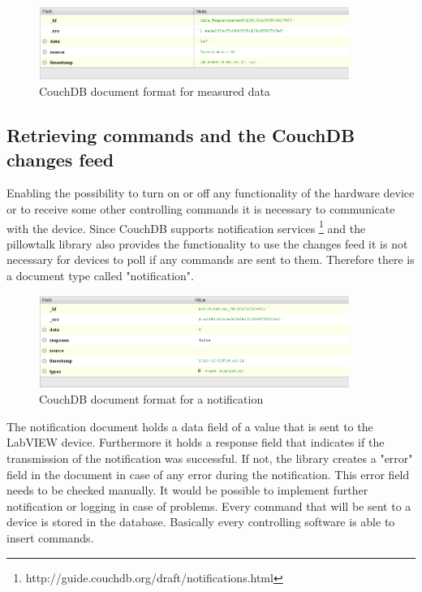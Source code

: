 \begin{figure}[h!]
  \centering
      \includegraphics[width=0.9\textwidth]{images/CouchDBDoc_Data.png}
  \caption{CouchDB document format for measured data}
  \label{figure:CouchDBDocumentFormatData}
\end{figure}

\subsection{Retrieving commands and the CouchDB changes feed}
Enabling the possibility to turn on or off any functionality of the hardware device or to receive some other controlling commands it is necessary to communicate with the device. Since CouchDB supports notification services \footnote{http://guide.couchdb.org/draft/notifications.html} and the pillowtalk library also provides the functionality to use the changes feed it is not necessary for devices to poll if any commands are sent to them. Therefore there is a document type called "notification". \\

\begin{figure}[h!]
  \centering
      \includegraphics[width=0.9\textwidth]{images/CouchDBDoc_Notification.png}
  \caption{CouchDB document format for a notification}
  \label{figure:CouchDBDocumentFormatNotification}
\end{figure}

The notification document holds a data field of a value that is sent to the LabVIEW device. Furthermore it holds a response field that indicates if the transmission of the notification was successful. If not, the library creates a "error" field in the document in case of any error during the notification. This error field needs to be checked manually. It would be possible to implement further notification or logging in case of problems. Every command that will be sent to a device is stored in the database. Basically every controlling software is able to insert commands. \\

